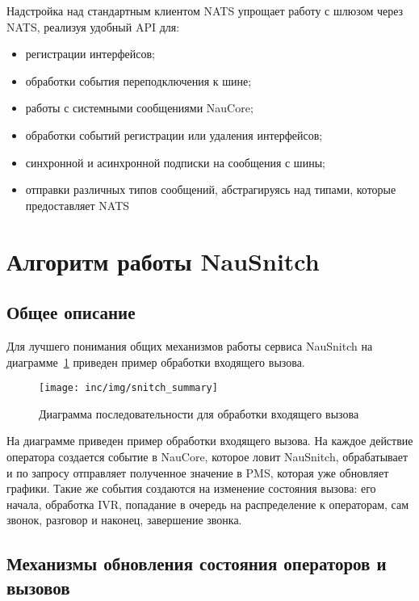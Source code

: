 Надстройка над стандартным клиентом NATS упрощает работу с шлюзом через NATS,
реализуя удобный API для:
\begin{itemize}
    \item регистрации интерфейсов;
    \item обработки события переподключения к шине;
    \item работы с системными сообщениями NauCore;
    \item обработки событий регистрации или удаления интерфейсов;
    \item синхронной и асинхронной подписки на сообщения с шины;
    \item отправки различных типов сообщений, абстрагируясь над типами, которые предоставляет NATS\@
\end{itemize}

\section{Алгоритм работы NauSnitch}

\subsection{Общее описание}

Для лучшего понимания общих механизмов работы сервиса NauSnitch
на диаграмме~\ref{pic:uml-seq-summary} приведен пример обработки входящего вызова.

\begin{figure}[!ht]
    \centering
    \texttt{[image: inc/img/snitch\_summary]}
    \caption{Диаграмма последовательности для обработки входящего вызова}
    \label{pic:uml-seq-summary}
\end{figure}

На диаграмме приведен пример обработки входящего вызова.
На каждое действие оператора создается событие в NauCore, которое ловит NauSnitch,
обрабатывает и по запросу отправляет полученное значение в PMS,
которая уже обновляет графики.
Такие же события создаются на изменение состояния вызова: его начала, обработка IVR,
попадание в очередь на распределение к операторам, сам звонок, разговор и наконец, завершение звонка.

\subsection{Механизмы обновления состояния операторов и вызовов}\label{subsec:механизмы-обновления-состояния-операторов-и-вызовов}

